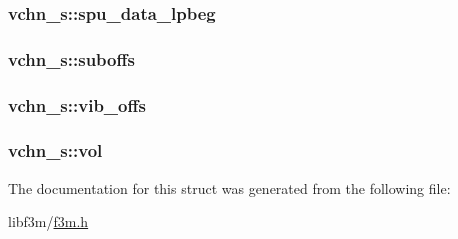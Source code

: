 \subsubsection[{spu\+\_\+data\+\_\+lpbeg}]{ vchn\+\_\+s\+::spu\+\_\+data\+\_\+lpbeg}\label{structvchn__s_a34db93418f7b611c77e26b7529de695e}
\hypertarget{structvchn__s_a1b02ef0b17eb67e13720ba05c670da05}{}
\subsubsection[{suboffs}]{ vchn\+\_\+s\+::suboffs}\label{structvchn__s_a1b02ef0b17eb67e13720ba05c670da05}
\hypertarget{structvchn__s_a1f1f455fd6b50be9d1ac5d8c205b7e50}{}
\subsubsection[{vib\+\_\+offs}]{ vchn\+\_\+s\+::vib\+\_\+offs}\label{structvchn__s_a1f1f455fd6b50be9d1ac5d8c205b7e50}
\hypertarget{structvchn__s_a855108d510f4ea3649e30ec51683be15}{}
\subsubsection[{vol}]{ vchn\+\_\+s\+::vol}\label{structvchn__s_a855108d510f4ea3649e30ec51683be15}


The documentation for this struct was generated from the following file\+:\begin{DoxyCompactItemize}
\item 
libf3m/\hyperlink{f3m_8h}{f3m.\+h}\end{DoxyCompactItemize}
